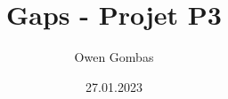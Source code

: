 \documentclass[french,a4paper,11pt]{report}
\title{Gaps - Projet P3}
\author{Owen Gombas}
\date{27.01.2023}
\begin{document}
\maketitle
\tableofcontents{}






\end{document}
